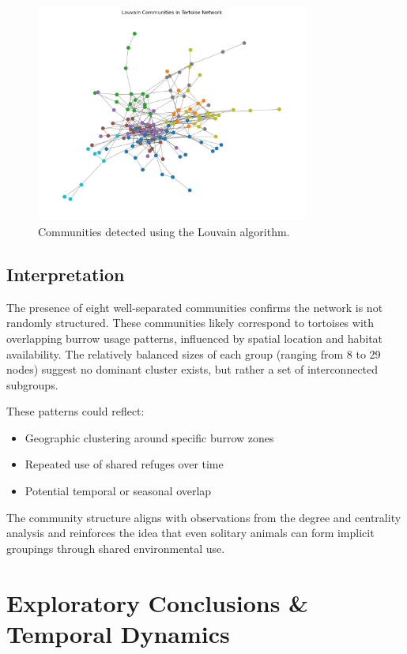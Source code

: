\documentclass[12pt]{report}
\begin{document}
\begin{figure}[h!]
    \centering
    \includegraphics[width=0.8\textwidth]{Images/Community Detection.png}
    \caption{Communities detected using the Louvain algorithm.}
    \label{fig:community-visual}
\end{figure}

\section*{Interpretation}

The presence of eight well-separated communities confirms the network is not randomly structured. These communities likely correspond to tortoises with overlapping burrow usage patterns, influenced by spatial location and habitat availability. The relatively balanced sizes of each group (ranging from 8 to 29 nodes) suggest no dominant cluster exists, but rather a set of interconnected subgroups.

These patterns could reflect:
\begin{itemize}
    \item Geographic clustering around specific burrow zones
    \item Repeated use of shared refuges over time
    \item Potential temporal or seasonal overlap
\end{itemize}

The community structure aligns with observations from the degree and centrality analysis and reinforces the idea that even solitary animals can form implicit groupings through shared environmental use.

\chapter*{Exploratory Conclusions \& Temporal Dynamics}
\end{document}
